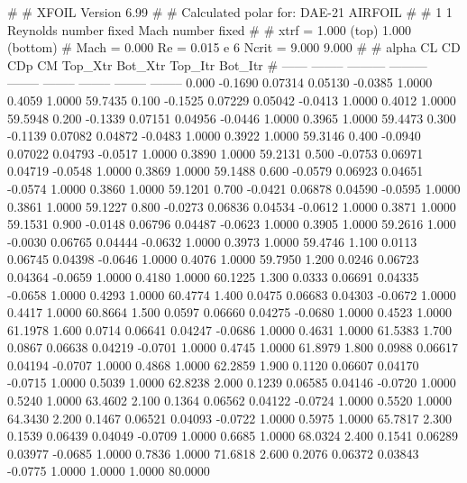#  
#       XFOIL         Version 6.99
#  
# Calculated polar for: DAE-21 AIRFOIL                                  
#  
# 1 1 Reynolds number fixed          Mach number fixed         
#  
# xtrf =   1.000 (top)        1.000 (bottom)  
# Mach =   0.000     Re =     0.015 e 6     Ncrit =   9.000  9.000
#  
#   alpha    CL        CD       CDp       CM     Top_Xtr  Bot_Xtr  Top_Itr  Bot_Itr
#  ------ -------- --------- --------- -------- -------- -------- -------- --------
   0.000  -0.1690   0.07314   0.05130  -0.0385   1.0000   0.4059   1.0000  59.7435
   0.100  -0.1525   0.07229   0.05042  -0.0413   1.0000   0.4012   1.0000  59.5948
   0.200  -0.1339   0.07151   0.04956  -0.0446   1.0000   0.3965   1.0000  59.4473
   0.300  -0.1139   0.07082   0.04872  -0.0483   1.0000   0.3922   1.0000  59.3146
   0.400  -0.0940   0.07022   0.04793  -0.0517   1.0000   0.3890   1.0000  59.2131
   0.500  -0.0753   0.06971   0.04719  -0.0548   1.0000   0.3869   1.0000  59.1488
   0.600  -0.0579   0.06923   0.04651  -0.0574   1.0000   0.3860   1.0000  59.1201
   0.700  -0.0421   0.06878   0.04590  -0.0595   1.0000   0.3861   1.0000  59.1227
   0.800  -0.0273   0.06836   0.04534  -0.0612   1.0000   0.3871   1.0000  59.1531
   0.900  -0.0148   0.06796   0.04487  -0.0623   1.0000   0.3905   1.0000  59.2616
   1.000  -0.0030   0.06765   0.04444  -0.0632   1.0000   0.3973   1.0000  59.4746
   1.100   0.0113   0.06745   0.04398  -0.0646   1.0000   0.4076   1.0000  59.7950
   1.200   0.0246   0.06723   0.04364  -0.0659   1.0000   0.4180   1.0000  60.1225
   1.300   0.0333   0.06691   0.04335  -0.0658   1.0000   0.4293   1.0000  60.4774
   1.400   0.0475   0.06683   0.04303  -0.0672   1.0000   0.4417   1.0000  60.8664
   1.500   0.0597   0.06660   0.04275  -0.0680   1.0000   0.4523   1.0000  61.1978
   1.600   0.0714   0.06641   0.04247  -0.0686   1.0000   0.4631   1.0000  61.5383
   1.700   0.0867   0.06638   0.04219  -0.0701   1.0000   0.4745   1.0000  61.8979
   1.800   0.0988   0.06617   0.04194  -0.0707   1.0000   0.4868   1.0000  62.2859
   1.900   0.1120   0.06607   0.04170  -0.0715   1.0000   0.5039   1.0000  62.8238
   2.000   0.1239   0.06585   0.04146  -0.0720   1.0000   0.5240   1.0000  63.4602
   2.100   0.1364   0.06562   0.04122  -0.0724   1.0000   0.5520   1.0000  64.3430
   2.200   0.1467   0.06521   0.04093  -0.0722   1.0000   0.5975   1.0000  65.7817
   2.300   0.1539   0.06439   0.04049  -0.0709   1.0000   0.6685   1.0000  68.0324
   2.400   0.1541   0.06289   0.03977  -0.0685   1.0000   0.7836   1.0000  71.6818
   2.600   0.2076   0.06372   0.03843  -0.0775   1.0000   1.0000   1.0000  80.0000
